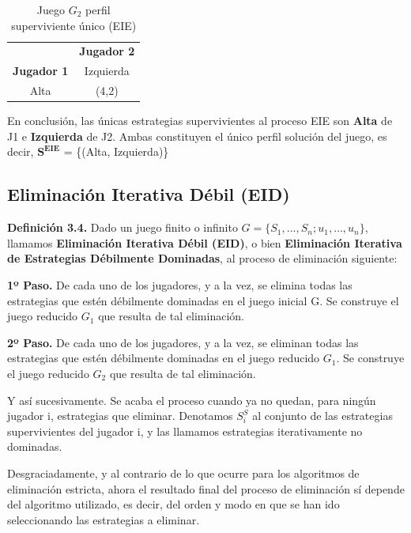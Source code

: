 \documentclass[12pt,a4paper,]{book}
\numberwithin{dummy}{section}
\theoremstyle{ocrenumbox}
\theoremstyle{blacknumex}
\theoremstyle{blacknumbox}
\theoremstyle{ocrenum}
\theoremstyle{ocrenum}
\begin{document}
\begin{tcolorbox}[colback=blue!10]
\begin{table}[H]
\centering
\begin{tabular}{c|c}
 & \multicolumn{1}{c}{\textbf{Jugador 2}} \\ 
\textbf{Jugador 1} & Izquierda\\ \hline
Alta & (4,2)\\
\end{tabular}
\caption{Juego $G_2$ perfil superviviente único (EIE)}
\label{tab:EIE}
\end{table}

En conclusión, las únicas estrategias supervivientes al proceso EIE son \textbf{Alta} de J1 e \textbf{Izquierda} de J2. Ambas constituyen el único perfil solución del juego, es decir, $\mathbf{S^{EIE}}$ = \{(Alta, Izquierda)\}
\end{tcolorbox}

\subsection{Eliminación Iterativa Débil
(EID)}\label{eliminaciuxf3n-iterativa-duxe9bil-eid}

\textbf{Definición 3.4.} Dado un juego finito o infinito
\(G = \{S_1,\ldots,S_n;u_1,\ldots,u_n\}\), llamamos \textbf{Eliminación
Iterativa Débil (EID)}, o bien \textbf{Eliminación Iterativa de
Estrategias Débilmente Dominadas}, al proceso de eliminación siguiente:

\textbf{1º Paso.} De cada uno de los jugadores, y a la vez, se elimina
todas las estrategias que estén débilmente dominadas en el juego inicial
G. Se construye el juego reducido \(G_1\) que resulta de tal
eliminación.

\textbf{2º Paso.} De cada uno de los jugadores, y a la vez, se eliminan
todas las estrategias que estén débilmente dominadas en el juego
reducido \(G_1\). Se construye el juego reducido \(G_2\) que resulta de
tal eliminación.

Y así sucesivamente. Se acaba el proceso cuando ya no quedan, para
ningún jugador i, estrategias que eliminar. Denotamos \(S^S_i\) al
conjunto de las estrategias supervivientes del jugador i, y las llamamos
estrategias iterativamente no dominadas.

Desgraciadamente, y al contrario de lo que ocurre para los algoritmos de
eliminación estricta, ahora el resultado final del proceso de
eliminación sí depende del algoritmo utilizado, es decir, del orden y
modo en que se han ido seleccionando las estrategias a eliminar.
\end{document}
